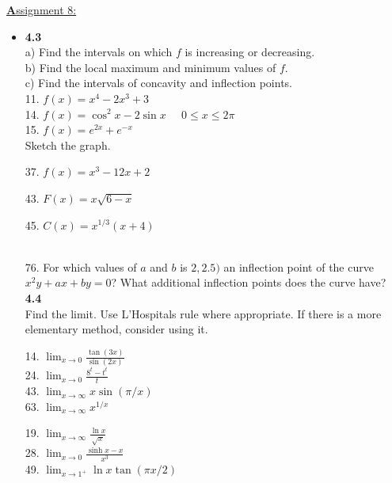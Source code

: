 \documentclass{letter}
\begin{document}
	\clearpage
	\large\underline{\textbf Assignment 8:}
	\begin{itemize}
		\item[] \textbf{4.3}\\
		
		a) Find the intervals on which $f$ is increasing or decreasing.\\
		b) Find the local maximum and minimum values of $f$.\\
		c) Find the intervals of concavity and inflection points.\\
		11. $f(x) = x^4 - 2x^3 + 3$\\
		14. $f(x) = \cos ^2 x - 2 \sin x \;\;\;\;\; 0 \leq x \leq 2\pi$\\
		15. $f(x) = e^{2x} + e^{-x}$\\
		
		Sketch the graph.\\
		\begin{minipage}[t]{0.3\textwidth}
			37. $f(x) = x^3 - 12x + 2$
		\end{minipage}
		\begin{minipage}[t]{0.3\textwidth}
			43. $F(x) = x \sqrt{6-x}$
		\end{minipage}
		\begin{minipage}[t]{0.3\textwidth}
			45. $C(x) = x^{1/3}(x+4)$\\
		\end{minipage}\\
		
		76. For which values of $a$ and $b$ is $2, 2.5)$ an inflection point of the curve $x^2 y + ax + by = 0$? What additional inflection points does the curve have?\\
		
		\textbf{4.4}\\
		
		Find the limit. Use L'Hospitals rule where appropriate. If there is a more elementary method, consider using it.\\
		\begin{minipage}[t]{0.5\textwidth}
			14. $\displaystyle \lim_{x \to 0} \frac{\tan (3x)}{\sin (2x)}$\\
			24. $\displaystyle \lim_{x \to 0} \frac{8^t - t^t}{t}$\\
			43. $\displaystyle \lim_{x \to \infty}x \sin(\pi / x)$\\
			63. $\displaystyle \lim_{x \to \infty} x^{1/x}$\\
		\end{minipage}
		\begin{minipage}[t]{0.5\textwidth}
			19. $\displaystyle \lim_{x \to \infty}\frac{\ln x}{\sqrt x}$\\
			28. $\displaystyle \lim_{x \to 0} \frac{\sinh x - x}{x^3}$\\
			49. $\displaystyle \lim_{x \to 1^+} \ln x \tan(\pi x/2)$\\
		\end{minipage}
		

\end{itemize}
\end{document}
